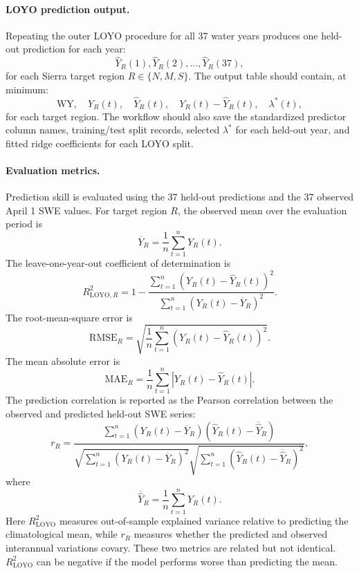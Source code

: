 \documentclass[11pt]{article}
\begin{document}
\paragraph{LOYO prediction output.}
Repeating the outer LOYO procedure for all 37 water years produces one held-out prediction for each
year:
\[
\widehat{Y}_R(1),\widehat{Y}_R(2),\ldots,\widehat{Y}_R(37),
\]
for each Sierra target region $R\in\{N,M,S\}$. The output table should contain, at minimum:
\[
\mathrm{WY},\quad
Y_R(t),\quad
\widehat{Y}_R(t),\quad
Y_R(t)-\widehat{Y}_R(t),\quad
\lambda^\ast(t),
\]
for each target region. The workflow should also save the standardized predictor column names,
training/test split records, selected $\lambda^\ast$ for each held-out year, and fitted ridge
coefficients for each LOYO split.

\paragraph{Evaluation metrics.}
Prediction skill is evaluated using the 37 held-out predictions and the 37 observed April 1 SWE
values. For target region $R$, the observed mean over the evaluation period is
\[
\overline{Y}_R
=
\frac{1}{n}\sum_{t=1}^{n}Y_R(t).
\]
The leave-one-year-out coefficient of determination is
\[
R^2_{\mathrm{LOYO},R}
=
1
-
\frac{
\sum_{t=1}^{n}
\left(Y_R(t)-\widehat{Y}_R(t)\right)^2
}{
\sum_{t=1}^{n}
\left(Y_R(t)-\overline{Y}_R\right)^2
}.
\]
The root-mean-square error is
\[
\mathrm{RMSE}_R
=
\sqrt{
\frac{1}{n}
\sum_{t=1}^{n}
\left(Y_R(t)-\widehat{Y}_R(t)\right)^2
}.
\]
The mean absolute error is
\[
\mathrm{MAE}_R
=
\frac{1}{n}
\sum_{t=1}^{n}
\left|
Y_R(t)-\widehat{Y}_R(t)
\right|.
\]
The prediction correlation is reported as the Pearson correlation between the observed and predicted
held-out SWE series:
\[
r_R
=
\frac{
\sum_{t=1}^{n}
\left(Y_R(t)-\overline{Y}_R\right)
\left(\widehat{Y}_R(t)-\overline{\widehat{Y}}_R\right)
}{
\sqrt{
\sum_{t=1}^{n}
\left(Y_R(t)-\overline{Y}_R\right)^2
}
\sqrt{
\sum_{t=1}^{n}
\left(\widehat{Y}_R(t)-\overline{\widehat{Y}}_R\right)^2
}
},
\]
where
\[
\overline{\widehat{Y}}_R
=
\frac{1}{n}\sum_{t=1}^{n}\widehat{Y}_R(t).
\]
Here $R^2_{\mathrm{LOYO}}$ measures out-of-sample explained variance relative to predicting the
climatological mean, while $r_R$ measures whether the predicted and observed interannual
variations covary. These two metrics are related but not identical. $R^2_{\mathrm{LOYO}}$ can be
negative if the model performs worse than predicting the mean.
\end{document}
